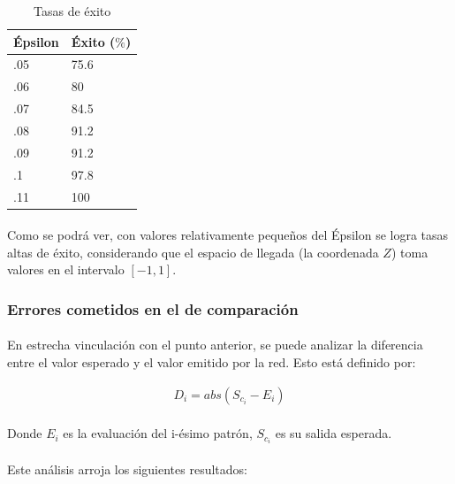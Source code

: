 \documentclass[12pt, twocolumn]{article}
\begin{document}
	\begin{table}[H]
		\centering
		\begin{tabular}{ll}
			\hline
			Épsilon & Éxito ($\%$)\\ \hline
			.05     & 75.6  \\
			.06     & 80    \\
			.07     & 84.5  \\
			.08     & 91.2  \\
			.09     & 91.2  \\
			.1      & 97.8  \\
			.11     & 100   \\ \hline
			\end{tabular}
			\caption{Tasas de éxito}
			\label{ex1}
	\end{table}
	
	\paragraph{} Como se podrá ver, con valores relativamente pequeños del Épsilon se logra tasas altas de éxito, considerando que el espacio de llegada (la coordenada $Z$) toma valores en el intervalo $\left[-1, 1\right]$.
	
	\subsubsection{Errores cometidos en el  de comparación}
	
	\paragraph{} En estrecha vinculación con el punto anterior, se puede analizar la diferencia entre el valor esperado y el valor emitido por la red. Esto está definido por:
	
	\begin{align}
		D_{i} = abs(S_{c_{i}}-E_{i})
	\end{align}
	
	\paragraph{} Donde $E_{i}$ es la evaluación del i-ésimo patrón, $S_{c_{i}}$ es su salida esperada.
	
	\paragraph{} Este análisis arroja los siguientes resultados:
	
\end{document}
